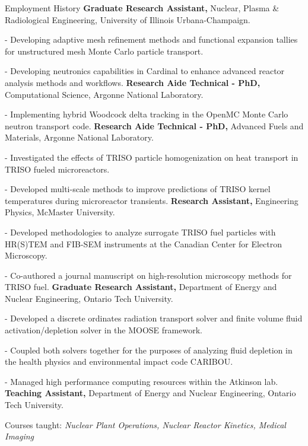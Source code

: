 \begin{rubric}{Employment History}
    \textbf{Graduate Research Assistant,} Nuclear, Plasma \& Radiological Engineering, University of Illinois Urbana-Champaign.
    \par - Developing adaptive mesh refinement methods and functional expansion tallies for unstructured mesh Monte Carlo particle transport.
    \par - Developing neutronics capabilities in Cardinal to enhance advanced reactor analysis methods and workflows.
    \textbf{Research Aide Technical - PhD,} Computational Science, Argonne National Laboratory.
    \par - Implementing hybrid Woodcock delta tracking in the OpenMC Monte Carlo neutron transport code.
    \textbf{Research Aide Technical - PhD,} Advanced Fuels and Materials, Argonne National Laboratory.
    \par - Investigated the effects of TRISO particle homogenization on heat transport in TRISO fueled microreactors.
    \par - Developed multi-scale methods to improve predictions of TRISO kernel temperatures during microreactor transients.
    \textbf{Research Assistant,} Engineering Physics, McMaster University.
    \par - Developed methodologies to analyze surrogate TRISO fuel particles with HR(S)TEM and FIB-SEM instruments at the Canadian Center for Electron Microscopy.
    \par - Co-authored a journal manuscript on high-resolution microscopy methods for TRISO fuel.
    \textbf{Graduate Research Assistant,} Department of Energy and Nuclear Engineering, Ontario Tech University.
    \par - Developed a discrete ordinates radiation transport solver and finite volume fluid activation/depletion solver in the MOOSE framework.
    \par - Coupled both solvers together for the purposes of analyzing fluid depletion in the health physics and environmental impact code CARIBOU.
    \par - Managed high performance computing resources within the Atkinson lab.
    \textbf{Teaching Assistant,} Department of Energy and Nuclear Engineering, Ontario Tech University.
    \par Courses taught: \emph{Nuclear Plant Operations, Nuclear Reactor Kinetics, Medical Imaging}

\end{rubric}
